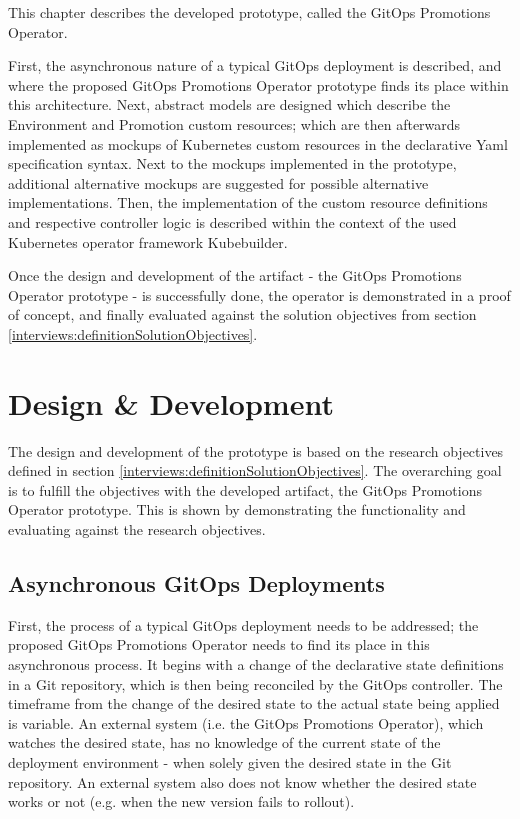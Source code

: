 This chapter describes the developed prototype,
called the GitOps Promotions Operator.

First, the asynchronous nature of a typical GitOps deployment is described,
and where the proposed GitOps Promotions Operator prototype finds its place within
this architecture.
Next, abstract models are designed which describe the Environment and Promotion 
custom resources; which are then afterwards implemented as mockups of 
Kubernetes custom resources in the declarative Yaml specification syntax.
Next to the mockups implemented in the prototype,
additional alternative mockups are suggested for possible alternative implementations.
Then, the implementation of the custom resource definitions and respective controller logic
is described within the context of the used Kubernetes operator framework Kubebuilder.

Once the design and development of the artifact - the GitOps Promotions Operator prototype -
is successfully done,
the operator is demonstrated in a proof of concept,
and finally evaluated against the solution objectives
from section \ref{interviews:definitionSolutionObjectives}.

\section{Design \& Development}

The design and development of the prototype
is based on the research objectives defined in section
\ref{interviews:definitionSolutionObjectives}.
The overarching goal is to fulfill the objectives with the developed artifact,
the GitOps Promotions Operator prototype.
This is shown by demonstrating the functionality and evaluating against the research objectives.

\subsection{Asynchronous GitOps Deployments}

First, the process of a typical GitOps deployment needs to be addressed;
the proposed GitOps Promotions Operator needs to find its place in this asynchronous process.
It begins with a change of the declarative state definitions in a Git repository,
which is then being reconciled by the GitOps controller.
The timeframe from the change of the desired state to the actual state being applied
is variable. An external system (i.e. the GitOps Promotions Operator), which watches the desired state, has no knowledge of
the current state of the deployment environment - when solely given the desired state in the
Git repository. An external system also does not know whether the desired state works or not
(e.g. when the new version fails to rollout).

